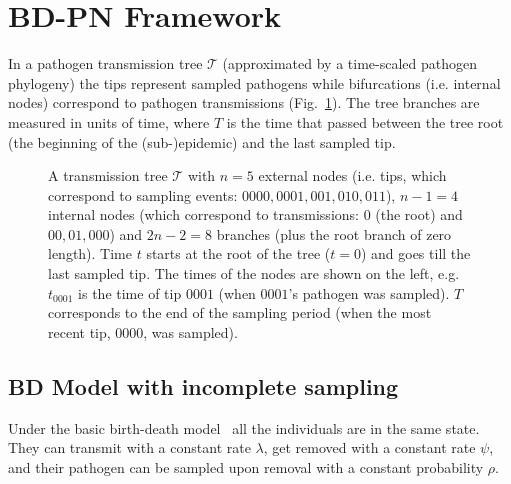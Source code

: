 \documentclass[a4paper,10pt]{article}
\begin{document}
\section{BD-PN Framework}
In a pathogen transmission tree $\mathscr{T}$ (approximated by a time-scaled pathogen phylogeny) the tips represent sampled pathogens %
while bifurcations (i.e. internal nodes) correspond to pathogen transmissions (Fig.~\ref{fig:tt}). The tree branches are measured in units of time, where $T$ is the time that passed between the tree root (the beginning of the (sub-)epidemic) and the last sampled tip. 


\begin{figure}[tbhp]
\centering 

\caption{A transmission tree $\mathscr{T}$ with $n=5$ external nodes (i.e. tips, which correspond to sampling events: $0000, 0001, 001, 010, 011$), $n-1=4$ internal nodes (which correspond to transmissions: $0$ (the root) and $00, 01, 000$) and $2n - 2 = 8$ branches (plus the root branch of zero length). %
Time $t$ starts at the root of the tree ($t=0$) and goes till the last sampled tip. The times of the nodes are shown on the left, e.g. $t_{0001}$ is the time of tip $0001$ (when $0001$'s pathogen was sampled). $T$ corresponds to the end of the sampling period (when the most recent tip, $0000$, was sampled).}
\label{fig:tt} 
\end{figure}

\subsection{BD Model with incomplete sampling}
Under the basic birth-death model~\citep{Stadler2009} all the individuals are in the same state. They can transmit with a constant rate $\lambda$, get removed with a constant rate $\psi$, and their pathogen can be sampled upon removal with a constant probability $\rho$. 

\end{document}
